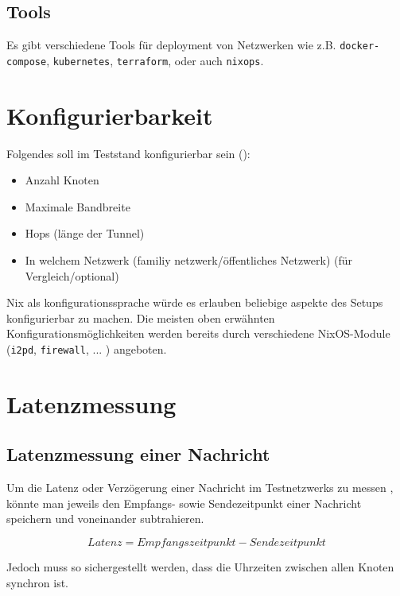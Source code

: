 \subsection{Tools}

Es gibt verschiedene Tools für deployment von Netzwerken wie z.B. \lstinline|docker-compose|, \lstinline|kubernetes|, \lstinline|terraform|, oder auch \lstinline|nixops|.


\section{Konfigurierbarkeit}

Folgendes soll im Teststand konfigurierbar sein ():

\begin{itemize}
    \item Anzahl Knoten
    \item Maximale Bandbreite
    \item Hops (länge der Tunnel)
    \item In welchem Netzwerk (familiy netzwerk/öffentliches Netzwerk) (für Vergleich/optional)
\end{itemize}

Nix als konfigurationssprache würde es erlauben beliebige aspekte des Setups konfigurierbar zu machen.
Die meisten oben erwähnten Konfigurationsmöglichkeiten werden bereits durch verschiedene NixOS-Module (\lstinline|i2pd|, \lstinline|firewall|, ... ) angeboten.

\section{Latenzmessung}

\subsection{Latenzmessung einer Nachricht}

Um die Latenz oder Verzögerung einer Nachricht im Testnetzwerks zu messen , könnte man jeweils den Empfangs- sowie Sendezeitpunkt einer Nachricht speichern und voneinander subtrahieren.

\begin{equation}
    Latenz = Empfangszeitpunkt - Sendezeitpunkt
\end{equation}

Jedoch muss so sichergestellt werden, dass die Uhrzeiten zwischen allen Knoten synchron ist.


